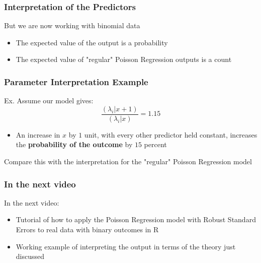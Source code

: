 \documentclass{beamer}
\begin{document}
\begin{frame}[fragile]\frametitle{Interpretation of the Predictors}

	But we are now working with binomial data
	\begin{itemize}
	
		\item The expected value of the output is a probability
		
		\item The expected value of "regular" Poisson Regression outputs is a count 
	
	\end{itemize}
	
\end{frame}



\begin{frame}[fragile]\frametitle{Parameter Interpretation Example}
	
	Ex. Assume our model gives: $$ \frac{(\lambda_i|x+1)}{(\lambda_i|x)} = 1.15 $$
	
	\begin{itemize}
		
		\item An increase in $x$ by $1$ unit, with every other predictor held constant, increases the \textbf{probability of the outcome} by $15$ percent
	
	\end{itemize}
	
	Compare this with the interpretation for the "regular" Poisson Regression model
	
\end{frame}



\begin{frame}[fragile]\frametitle{In the next video}
	
	In the next video:	
	
	\begin{itemize}
	
		\item Tutorial of how to apply the Poisson Regression model with Robust Standard Errors to real data with binary outcomes in R
		
		\item Working example of interpreting the output in terms of the theory just discussed
		
	\end{itemize}
	
\end{frame}
\end{document}
